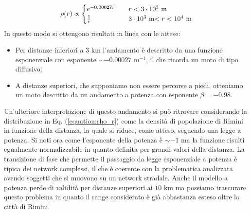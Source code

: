 \documentclass[12pt,a4paper]{article}
\begin{document}
\begin{equation}
\rho(r)\propto
\begin{cases}
e^{-0.00027 r} \quad &r<3\cdot 10^3$ m$\\
\frac{1}{r} \quad &3\cdot 10^3$ m$< r < 10^4$ m$
\end{cases}
\label{equation:rho_r}
\end{equation}
In questo modo si ottengono risultati in linea con le attese: 
\begin{itemize}
\item Per distanze inferiori a $3$ km l'andamento è descritto da una funzione esponenziale con esponente $\sim - 0.00027$ m$^{-1}$, il che ricorda un moto di tipo diffusivo;
\item A distanze superiori, che supponiamo non essere percorse a piedi, otteniamo un moto descritto da un andamento a potenza con esponente $\beta = -0.98$.
\end{itemize}
Un'ulteriore interpretazione di questo andamento si può ritrovare considerando la distribuzione in Eq. (\ref{equation:rho_r}) come la densità di popolazione di Rimini in funzione della distanza, la quale si riduce, come atteso, seguendo una legge a potenza.
Si noti ora come l'esponente della potenza è $\sim -1$ ma la funzione risulti egualmente normalizzabile in quanto definita per grandi valori della distanza.
La transizione di fase che permette il passaggio da legge esponenziale a potenza è tipica dei network complessi, il che è coerente con la problematica analizzata avendo soggetti che si muovono su un network stradale.
Anche il modello a potenza perde di validità per distanze superiori ai $10$ km ma possiamo trascurare questo problema in quanto il range considerato è già abbastanza esteso oltre la città di Rimini.\\
\end{document}
